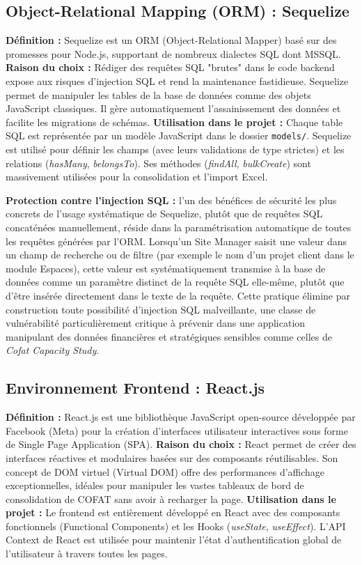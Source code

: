 \subsection{Object-Relational Mapping (ORM) : Sequelize}
\textbf{Définition :} Sequelize est un ORM (Object-Relational Mapper) basé sur des promesses pour Node.js, supportant de nombreux dialectes SQL dont MSSQL.
\newline
\textbf{Raison du choix :} Rédiger des requêtes SQL "brutes" dans le code backend expose aux risques d'injection SQL et rend la maintenance fastidieuse. Sequelize permet de manipuler les tables de la base de données comme des objets JavaScript classiques. Il gère automatiquement l'assainissement des données et facilite les migrations de schémas.
\newline
\textbf{Utilisation dans le projet :} Chaque table SQL est représentée par un modèle JavaScript dans le dossier \texttt{models/}. Sequelize est utilisé pour définir les champs (avec leurs validations de type strictes) et les relations (\textit{hasMany}, \textit{belongsTo}). Ses méthodes (\textit{findAll}, \textit{bulkCreate}) sont massivement utilisées pour la consolidation et l'import Excel.

\textbf{Protection contre l'injection SQL :} l'un des bénéfices de sécurité les plus concrets de l'usage systématique de Sequelize, plutôt que de requêtes SQL concaténées manuellement, réside dans la paramétrisation automatique de toutes les requêtes générées par l'ORM. Lorsqu'un Site Manager saisit une valeur dans un champ de recherche ou de filtre (par exemple le nom d'un projet client dans le module Espaces), cette valeur est systématiquement transmise à la base de données comme un paramètre distinct de la requête SQL elle-même, plutôt que d'être insérée directement dans le texte de la requête. Cette pratique élimine par construction toute possibilité d'injection SQL malveillante, une classe de vulnérabilité particulièrement critique à prévenir dans une application manipulant des données financières et stratégiques sensibles comme celles de \textit{Cofat Capacity Study}.

\subsection{Environnement Frontend : React.js}
\textbf{Définition :} React.js est une bibliothèque JavaScript open-source développée par Facebook (Meta) pour la création d'interfaces utilisateur interactives sous forme de Single Page Application (SPA).
\newline
\textbf{Raison du choix :} React permet de créer des interfaces réactives et modulaires basées sur des composants réutilisables. Son concept de DOM virtuel (Virtual DOM) offre des performances d'affichage exceptionnelles, idéales pour manipuler les vastes tableaux de bord de consolidation de COFAT sans avoir à recharger la page.
\newline
\textbf{Utilisation dans le projet :} Le frontend est entièrement développé en React avec des composants fonctionnels (Functional Components) et les Hooks (\textit{useState}, \textit{useEffect}). L'API Context de React est utilisée pour maintenir l'état d'authentification global de l'utilisateur à travers toutes les pages.

